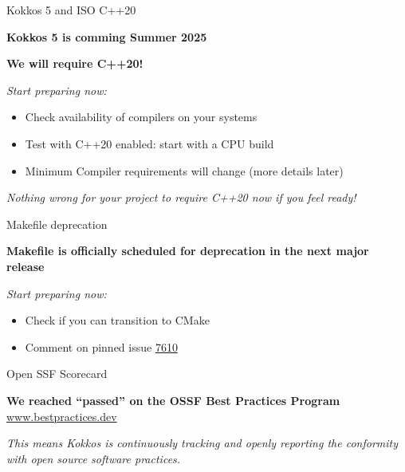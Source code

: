 \begin{frame}[fragile]{Kokkos 5 and ISO C++20}
\begin{center}
\textbf{Kokkos 5 is comming Summer 2025}

\vspace{0.5cm}
\textbf{We will require C++20!}
\end{center}

\textit{Start preparing now:}
\begin{itemize}
  \item{Check availability of compilers on your systems}
  \item{Test with C++20 enabled: start with a CPU build}
  \item{Minimum Compiler requirements will change (more details later)}
\end{itemize}

\vspace{0.5cm}
\begin{center}
\textit{Nothing wrong for your project to require C++20 now if you feel ready!}
\end{center}
\end{frame}

\begin{frame}[fragile]{Makefile deprecation}
\begin{center}
\textbf{Makefile is officially scheduled for deprecation in the next major release}

\textit{Start preparing now:}
\begin{itemize}
  \item{Check if you can transition to CMake}
  \item{Comment on pinned issue \href{https://github.com/kokkos/kokkos/issues/7610}{7610}}
\end{itemize}
\end{center}

\end{frame}

\begin{frame}[fragile]{Open SSF Scorecard}
\begin{center}
\textbf{We reached ``passed'' on the OSSF Best Practices Program}
\href{https://www.bestpractices.dev/en/projects/9344}{www.bestpractices.dev}

\vspace{0.5cm}
\textit{This means Kokkos is continuously tracking and openly reporting the conformity with open source software practices.}
\end{center}

\end{frame}
